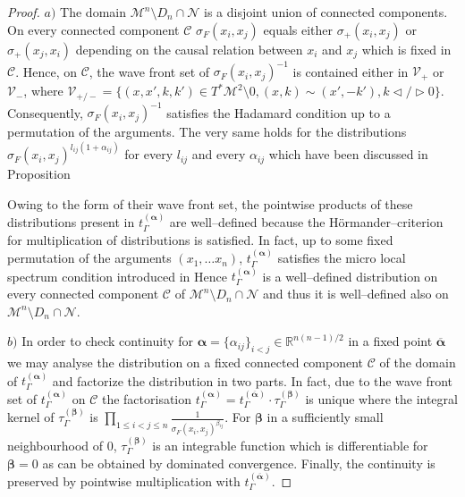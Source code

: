 \documentclass[10pt]{book}
\newcommand{\Mcal}{\mathcal{M}}
\newcommand{\Ncal}{\mathcal{N}}
\theoremstyle{break}
\newtheorem{proof}{Proof}
\begin{document}
\begin{proof}

$a)$ The domain $\Mcal^n\setminus D_n\cap \Ncal$ is a disjoint union of connected components. On every connected component $\mathcal{C}$ $\sigma_F(x_i,x_j)$ equals either $\sigma_+(x_i,x_j)$ or $\sigma_+(x_j,x_i)$ depending on the causal relation between $x_i$ and $x_j$ which is fixed in $\mathcal{C}$.
Hence, on $\mathcal{C}$, the wave front set of $\sigma_F(x_i,x_j)^{-1}$ is contained either in $\mathcal{V}_+$ or $\mathcal{V}_-$, where $\mathcal{V}_{+/-} = \{(x,x',k,k') \in T^*\Mcal^2\setminus 0, (x,k)\sim (x',-k'),  k \triangleleft / \triangleright 0  \}$. Consequently, $\sigma_F(x_i,x_j)^{-1}$ satisfies the Hadamard condition up to a permutation of the arguments. The very same holds for the distributions $\sigma_F(x_i,x_j)^{l_{ij}(1+\alpha_{ij})}$ for every $l_{ij}$ and every $\alpha_{ij}$ which have been discussed in Proposition %

Owing to the form of their wave front set, the pointwise products of these distributions present in $t_\Gamma^{(\boldsymbol{\alpha})}$ are well--defined because the H\"ormander--criterion for multiplication of distributions is satisfied. In fact, up to some fixed permutation of the arguments $(x_1,\dots x_n)$, $t_\Gamma^{(\boldsymbol{\alpha})}$ satisfies the micro local spectrum condition introduced in %
Hence $t_\Gamma^{(\boldsymbol{\alpha})}$ is a well--defined distribution on every connected component $\mathcal{C}$ of $\Mcal^n\setminus D_n\cap \Ncal$ and thus it is well--defined also on $\Mcal^n\setminus D_n\cap \Ncal$. 

$b)$ 
In order to check continuity for $\boldsymbol{\alpha}= \{\alpha_{ij}\}_{i<j}\in \mathbb{R}^{n(n-1)/2}$ in a fixed point $\overline{\boldsymbol{\alpha}}$ we may analyse the distribution on a fixed connected component $\mathcal{C}$ of the domain of $t_\Gamma^{(\boldsymbol{\alpha})}$ and factorize the distribution in two parts. 
In fact, due to the wave front set of $t_\Gamma^{(\boldsymbol{\alpha})}$ on $\mathcal{C}$ the factorisation $t_\Gamma^{(\boldsymbol{\alpha})} =t_\Gamma^{(\overline{\boldsymbol{\alpha}})} \cdot \tau_\Gamma^{(\boldsymbol{\beta})}$ is unique where the integral kernel of $\tau_\Gamma^{(\boldsymbol{\beta})}$ is $\prod_{1\leq i < j \leq n } \frac{1}{\sigma_F(x_i,x_j)^{\beta_{ij}}}$.
For $\boldsymbol{\beta}$ in a sufficiently small neighbourhood of $0$, $\tau_\Gamma^{(\boldsymbol{\beta})}$ is an integrable function which is differentiable for $\boldsymbol{\beta}=0$ as can be obtained by dominated convergence. Finally, the continuity is preserved by pointwise multiplication with $t_\Gamma^{(\overline{\boldsymbol{\alpha}})}$.


\end{proof}
\end{document}
